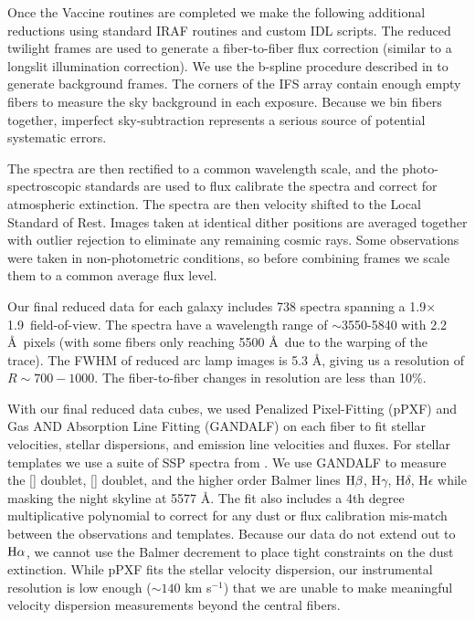 \documentclass[12pt,preprint]{aastex}
\newcommand\kms{km s$^{-1}$}
\newcommand\ha{$\rm{H}\alpha$}
\newcommand\hb{$\rm{H}\beta$}
\begin{document}
Once the Vaccine routines are completed we make the following additional reductions using standard IRAF routines and custom IDL scripts.
The reduced twilight frames are used to generate a fiber-to-fiber flux correction (similar to a longslit illumination correction).
We use the b-spline procedure described in \citet{Kelson03} to generate background frames.
The corners of the IFS array contain enough empty fibers to measure the sky background in each exposure.
Because we bin fibers together, imperfect sky-subtraction represents a serious source of potential systematic errors.


The spectra are then rectified to a common wavelength scale, and the photo-spectroscopic standards are used to flux calibrate the spectra and correct for atmospheric extinction.
The spectra are then velocity shifted to the Local Standard of Rest.
Images taken at identical dither positions are averaged together with outlier rejection to eliminate any remaining cosmic rays.
Some observations were taken in non-photometric conditions, so before combining frames we scale them to a common average flux level.


Our final reduced data for each galaxy includes 738 spectra spanning a 1.9\arcmin$\times$1.9\arcmin\ field-of-view.
The spectra have a wavelength range of $\sim$3550-5840 with 2.2 \AA\ pixels (with some fibers only reaching 5500 \AA\ due to the warping of the trace).
The FWHM of reduced arc lamp images is 5.3 \AA, giving us a resolution of $R\sim700-1000$.
The fiber-to-fiber changes in resolution are less than 10\%.


With our final reduced data cubes, we used Penalized Pixel-Fitting (pPXF) \citep{Cappellari04} and Gas AND Absorption Line Fitting (GANDALF) \citep{Sarzi06} on each fiber to fit stellar velocities, stellar dispersions, and emission line velocities and fluxes.
For stellar templates we use a suite of SSP spectra from \citet{Bruzual03}.
We use GANDALF to measure the [] doublet, [] doublet, and the higher order Balmer lines \hb, H$\gamma$, H$\delta$, H$\epsilon$ while masking the night skyline at 5577 \AA.
The fit also includes a 4th degree multiplicative polynomial to correct for any dust or flux calibration mis-match between the observations and templates.
Because our data do not extend out to \ha, we cannot use the Balmer decrement to place tight constraints on the dust extinction.
While pPXF fits the stellar velocity dispersion, our instrumental resolution is low enough ($\sim140$ \kms) that we are unable to make meaningful velocity dispersion measurements beyond the central fibers.
\end{document}
